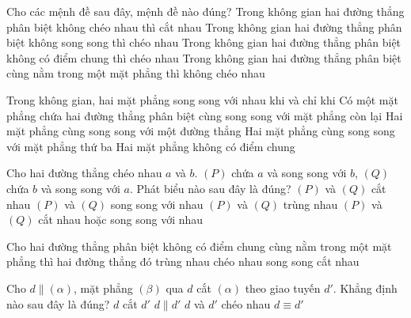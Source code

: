 \begin{ex}%
	Cho các mệnh đề sau đây, mệnh đề  nào đúng?
	\choice 
		{Trong  không gian hai đường thẳng phân biệt không chéo nhau thì cắt nhau}
		{Trong không gian hai đường thẳng phân  biệt không song song thì chéo nhau}
		{Trong  không gian hai đường thẳng phân biệt không có điểm chung thì chéo nhau}
		{\True Trong không gian hai đường thẳng phân biệt cùng nằm trong một mặt  phẳng thì không chéo nhau}
\end{ex}

\begin{ex}%
	Trong không gian, hai mặt phẳng song song với nhau khi và  chỉ khi
	 \choice
		{Có một mặt phẳng chứa hai đường thẳng phân biệt cùng song song với mặt  phẳng còn lại}
		{Hai mặt  phẳng cùng song song với một đường thẳng}
		{Hai mặt phẳng cùng song song  với mặt phẳng thứ ba}
		{\True Hai mặt phẳng  không có điểm chung}
\end{ex}

\begin{ex}%
	Cho hai đường thẳng chéo nhau  $a$ và $b$. $(P)$ chứa $a$ và song song với $b$, $(Q)$ chứa $b$ và song song với $a$. Phát biểu nào sau đây là đúng?
	 \choice
		{$(P)$  và $(Q)$ cắt nhau}
		{\True $(P)$ và $(Q)$ song song với  nhau}
		 {$(P)$ và $(Q)$ trùng nhau}
		{$(P)$ và $(Q)$ cắt nhau hoặc song song với nhau} 
\end{ex}

\begin{ex}%
	Cho hai đường thẳng phân biệt không có điểm chung cùng nằm trong một mặt phẳng  thì hai đường thẳng đó
	\choice 
		{trùng  nhau}
		{chéo nhau} 
		{\True  song song}
		{cắt  nhau}
\end{ex}

\begin{ex}%
	Cho $d\parallel (\alpha)$, mặt phẳng $(\beta)$ qua $d$ cắt  $(\alpha)$ theo giao tuyến $d'$. Khẳng định nào sau đây là đúng?
	 \choice
		 {$d$ cắt $d'$}
		{\True  $d\parallel d' $}
		{$d$ và  $d'$ chéo nhau}
		{$d\equiv d' $} 
\end{ex}

